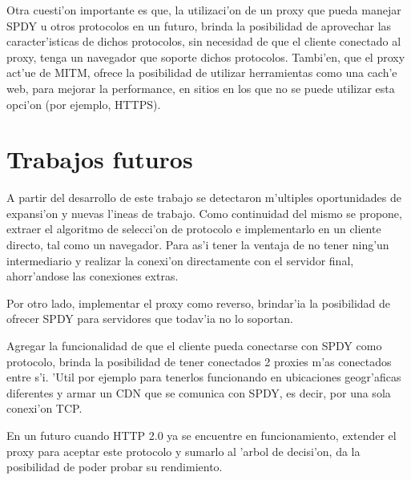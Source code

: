 Otra cuesti'on importante es que, la utilizaci'on de un proxy que pueda manejar SPDY u otros protocolos en un futuro, brinda la posibilidad de aprovechar las caracter'isticas de dichos protocolos, sin necesidad de que el cliente conectado al proxy, tenga un navegador que soporte dichos protocolos. Tambi'en, que el proxy act'ue de MITM, ofrece la posibilidad de utilizar herramientas como una cach'e web, para mejorar la performance, en sitios en los que no se puede utilizar esta opci'on (por ejemplo, HTTPS).

\section{Trabajos futuros}

A partir del desarrollo de este trabajo se detectaron m'ultiples oportunidades de expansi'on y nuevas l'ineas de trabajo. Como continuidad del mismo se propone, extraer el algoritmo de selecci'on de protocolo e implementarlo en un cliente directo, tal como un navegador. Para as'i tener la ventaja de no tener ning'un intermediario y realizar la conexi'on directamente con el servidor final, ahorr'andose las conexiones extras.

Por otro lado, implementar el proxy como reverso, brindar'ia la posibilidad de ofrecer SPDY para servidores que todav'ia no lo soportan.

Agregar la funcionalidad de que el cliente pueda conectarse con SPDY como protocolo, brinda la posibilidad de tener conectados 2 proxies m'as conectados entre s'i. 'Util por ejemplo para tenerlos funcionando en ubicaciones geogr'aficas diferentes y armar un CDN que se comunica con SPDY, es decir, por una sola conexi'on TCP.

En un futuro cuando HTTP 2.0 ya se encuentre en funcionamiento, extender el proxy para aceptar este protocolo y sumarlo al 'arbol de decisi'on, da la posibilidad de poder probar su rendimiento.